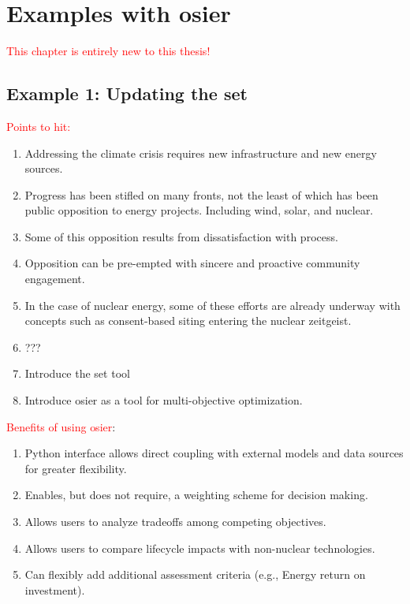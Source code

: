 



\chapter{Examples with \acs{osier}}
\label{chapter:examples}

\textcolor{red}{This chapter is entirely new to this thesis!}

\section{Example 1: Updating the \ac{set}}

\textcolor{red}{Points to hit:}
\begin{enumerate}
    \item Addressing the climate crisis requires new infrastructure and new energy sources.
    \item Progress has been stifled on many fronts, not the least of which has been public opposition to energy projects. Including wind, solar, and nuclear.
    \item Some of this opposition results from dissatisfaction with process.
    \item Opposition can be pre-empted with sincere and proactive community engagement.
    \item In the case of nuclear energy, some of these efforts are already underway with concepts such as consent-based siting entering the nuclear zeitgeist.
    \item ???
    \item Introduce the \ac{set} tool
    \item  Introduce \ac{osier} as a tool for multi-objective optimization.
\end{enumerate}

\textcolor{red}{Benefits of using \ac{osier}}:
\begin{enumerate}
    \item Python interface allows direct coupling with external models and data sources for greater flexibility.
    \item Enables, but does not require, a weighting scheme for decision making.
    \item Allows users to analyze tradeoffs among competing objectives.
    \item Allows users to compare lifecycle impacts with non-nuclear technologies.
    \item Can flexibly add additional assessment criteria (e.g., Energy return on investment). 
\end{enumerate}

